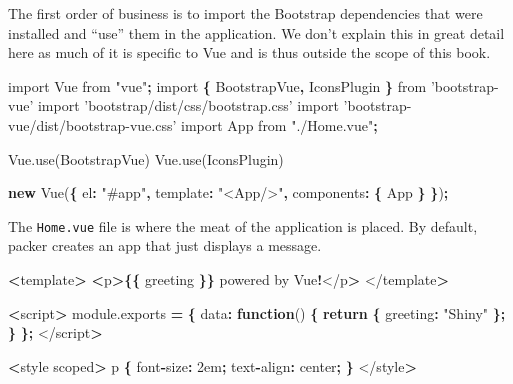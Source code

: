 \documentclass[10pt,]{krantz}
\makeatletter
\newenvironment{Shaded}{\begin{snugshade}}{\end{snugshade}}
\newcommand{\AttributeTok}[1]{\textcolor[rgb]{0.61,0.61,0.61}{#1}}
\newcommand{\ControlFlowTok}[1]{\textcolor[rgb]{0.27,0.27,0.27}{\textbf{#1}}}
\newcommand{\DataTypeTok}[1]{\textcolor[rgb]{0.27,0.27,0.27}{#1}}
\newcommand{\ImportTok}[1]{#1}
\newcommand{\KeywordTok}[1]{\textcolor[rgb]{0.27,0.27,0.27}{\textbf{#1}}}
\newcommand{\NormalTok}[1]{#1}
\newcommand{\OperatorTok}[1]{\textcolor[rgb]{0.43,0.43,0.43}{\textbf{#1}}}
\newcommand{\StringTok}[1]{\textcolor[rgb]{0.5,0.5,0.5}{#1}}
\newcommand{\VariableTok}[1]{\textcolor[rgb]{0,0,0}{#1}}
\newenvironment{kframe}{%
\medskip{}
\setlength{\fboxsep}{.8em}
 \def\at@end@of@kframe{}%
 \ifinner\ifhmode%
  \def\at@end@of@kframe{\end{minipage}}%
  \begin{minipage}{\columnwidth}%
 \fi\fi%
 \def\FrameCommand##1{\hskip\@totalleftmargin \hskip-\fboxsep
 \colorbox{shadecolor}{##1}\hskip-\fboxsep
     \hskip-\linewidth \hskip-\@totalleftmargin \hskip\columnwidth}%
 \MakeFramed {\advance\hsize-\width
   \@totalleftmargin\z@ \linewidth\hsize
   \@setminipage}}%
 {\par\unskip\endMakeFramed%
 \at@end@of@kframe}
\renewenvironment{Shaded}{\begin{kframe}}{\end{kframe}}
\makeatother
\begin{document}
The first order of business is to import the Bootstrap dependencies that were installed and ``use'' them in the application. We don't explain this in great detail here as much of it is specific to Vue and is thus outside the scope of this book.

\begin{Shaded}
\begin{Highlighting}[]
\ImportTok{import}\NormalTok{ Vue }\ImportTok{from} \StringTok{"vue"}\OperatorTok{;}
\ImportTok{import} \OperatorTok{\{}\NormalTok{ BootstrapVue}\OperatorTok{,}\NormalTok{ IconsPlugin }\OperatorTok{\}} \ImportTok{from} \StringTok{'bootstrap-vue'}
\ImportTok{import} \StringTok{'bootstrap/dist/css/bootstrap.css'}
\ImportTok{import} \StringTok{'bootstrap-vue/dist/bootstrap-vue.css'}
\ImportTok{import}\NormalTok{ App }\ImportTok{from} \StringTok{"./Home.vue"}\OperatorTok{;}

\VariableTok{Vue}\NormalTok{.}\AttributeTok{use}\NormalTok{(BootstrapVue)}
\VariableTok{Vue}\NormalTok{.}\AttributeTok{use}\NormalTok{(IconsPlugin)}

\KeywordTok{new} \AttributeTok{Vue}\NormalTok{(}\OperatorTok{\{}
  \DataTypeTok{el}\OperatorTok{:} \StringTok{"#app"}\OperatorTok{,}
  \DataTypeTok{template}\OperatorTok{:} \StringTok{"<App/>"}\OperatorTok{,}
  \DataTypeTok{components}\OperatorTok{:} \OperatorTok{\{}\NormalTok{ App }\OperatorTok{\}}
\OperatorTok{\}}\NormalTok{)}\OperatorTok{;}
\end{Highlighting}
\end{Shaded}

The \texttt{Home.vue} file is where the meat of the application is placed. By default, packer creates an app that just displays a message.

\begin{Shaded}
\begin{Highlighting}[]
\OperatorTok{<}\NormalTok{template}\OperatorTok{>}
  \OperatorTok{<}\NormalTok{p}\OperatorTok{>\{\{}\NormalTok{ greeting }\OperatorTok{\}\}}\NormalTok{ powered by Vue}\OperatorTok{!}\NormalTok{</p}\OperatorTok{>}
\NormalTok{</template}\OperatorTok{>}

\OperatorTok{<}\NormalTok{script}\OperatorTok{>}
\VariableTok{module}\NormalTok{.}\AttributeTok{exports} \OperatorTok{=} \OperatorTok{\{}
  \DataTypeTok{data}\OperatorTok{:} \KeywordTok{function}\NormalTok{() }\OperatorTok{\{}
    \ControlFlowTok{return} \OperatorTok{\{}
      \DataTypeTok{greeting}\OperatorTok{:} \StringTok{"Shiny"}
    \OperatorTok{\};}
  \OperatorTok{\}}
\OperatorTok{\};}
\NormalTok{</script}\OperatorTok{>}

\OperatorTok{<}\NormalTok{style scoped}\OperatorTok{>}
\NormalTok{p }\OperatorTok{\{}
\NormalTok{  font}\OperatorTok{-}\DataTypeTok{size}\OperatorTok{:}\NormalTok{ 2em}\OperatorTok{;}
\NormalTok{  text}\OperatorTok{-}\DataTypeTok{align}\OperatorTok{:}\NormalTok{ center}\OperatorTok{;}
\OperatorTok{\}}
\NormalTok{</style}\OperatorTok{>}
\end{Highlighting}
\end{Shaded}
\end{document}
